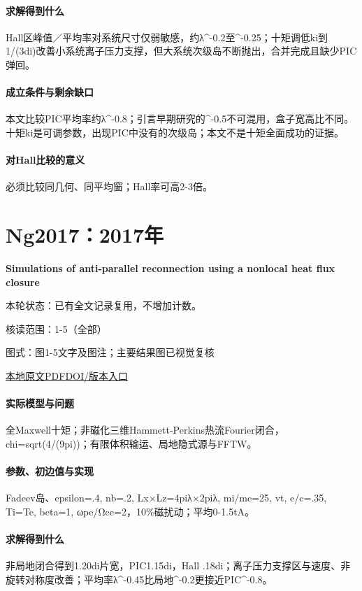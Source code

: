 \paragraph{求解得到什么}Hall区峰值／平均率对系统尺寸仅弱敏感，约λ\textasciicircum{}-0.2至\textasciicircum{}-0.25；十矩调低ki到1/(3di)改善小系统离子压力支撑，但大系统次级岛不断抛出，合并完成且缺少PIC弹回。

\paragraph{成立条件与剩余缺口}本文比较PIC平均率约λ\textasciicircum{}-0.8；引言早期研究的\textasciicircum{}-0.5不可混用，盒子宽高比不同。十矩ki是可调参数，出现PIC中没有的次级岛；本文不是十矩全面成功的证据。

\paragraph{对Hall比较的意义}必须比较同几何、同平均窗；Hall率可高2-3倍。

\section{Ng2017：2017年}\label{paper:Ng2017}

\textbf{Simulations of anti-parallel reconnection using a nonlocal heat flux closure}\citep{Ng2017}

\textsf{本轮状态：}已有全文记录复用，不增加计数。

\textsf{核读范围：}1-5（全部）\par\textsf{图式：}图1-5文字及图注；主要结果图已视觉复核

\href{run:../../papers/Ng2017.pdf}{本地原文PDF}\quad\href{https://doi.org/10.1063/1.4993195}{DOI/版本入口}

\paragraph{实际模型与问题}全Maxwell十矩；非磁化三维Hammett-Perkins热流Fourier闭合，chi=sqrt(4/(9pi))；有限体积输运、局地隐式源与FFTW。

\paragraph{参数、初边值与实现}Fadeev岛、epsilon=.4, nb=.2, Lx×Lz=4piλ×2piλ, mi/me=25, vt, e/c=.35, Ti=Te, beta=1, ωpe/Ωce=2，10\%磁扰动；平均0-1.5tA。

\paragraph{求解得到什么}非局地闭合得到1.20di片宽，PIC1.15di，Hall .18di；离子压力支撑区与速度、非旋转对称度改善；平均率λ\textasciicircum{}-0.45比局地\textasciicircum{}-0.2更接近PIC\textasciicircum{}-0.8。

